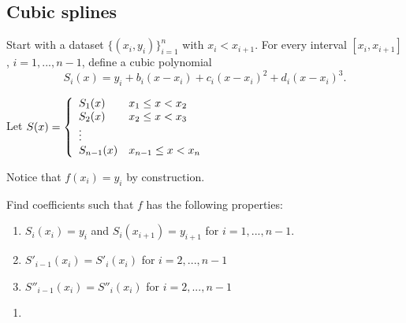 \documentclass[12pt,letterpaper,noanswers]{exam}
\begin{document}
\subsection*{Cubic splines}
\begin{tcolorbox}
Start with a dataset $\{(x_i,y_i)\}_{i=1}^n$ with $x_i < x_{i+1}$.  For every interval $[x_{i},x_{i+1}]$, $i=1,...,n-1$, define a cubic polynomial \[S_i(x) =  y_i + b_i(x-x_i) + c_i(x-x_i)^2 + d_i(x-x_i)^3.\]

Let $S(x) = \left\{\begin{array}{l l} S_1(x) & x_1\leq x < x_2 \\
S_2(x) & x_2\leq x < x_3 \\
\vdots \\
S_{n-1}(x) & x_{n-1}\leq x < x_n \\
\end{array}\right.$

Notice that $f(x_i) = y_i$ by construction.

Find coefficients such that $f$ has the following properties:
\begin{enumerate}
    \item $S_i(x_i) = y_i$ and $S_i(x_{i+1}) = y_{i+1}$ for $i = 1,...,n-1$.
    \item $S'_{i-1}(x_i) = S'_i(x_i)$ for $i = 2,...,n-1$
    \item $S''_{i-1}(x_i) = S''_i(x_i)$ for $i = 2,...,n-1$
\end{enumerate}
\end{tcolorbox}
\begin{enumerate}[resume=classQ]
\item 
{}
\end{enumerate}
\end{document}
